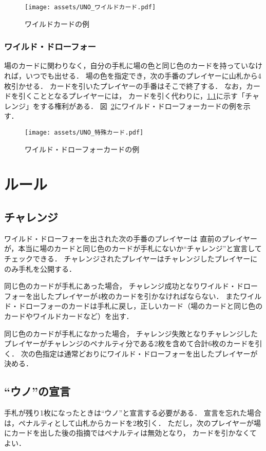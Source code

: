\documentclass[11pt]{ltjsarticle}
\newcommand{\figref}[1]{図~\ref{#1}}
\begin{document}
\begin{figure}[h]
  \begin{center}
    \texttt{[image: assets/UNO\_ワイルドカード.pdf]}
    \caption{ワイルドカードの例}
    \label{fig:ワイルドカードの例}
  \end{center}
\end{figure}

\subsubsection{ワイルド・ドローフォー}
場のカードに関わりなく，自分の手札に場の色と同じ色のカードを持っていなければ，いつでも出せる．
場の色を指定でき，次の手番のプレイヤーに山札から4枚引かせる．
カードを引いたプレイヤーの手番はそこで終了する．
なお，カードを引くこととなるプレイヤーには，
カードを引く代わりに，\ref{sec:チャレンジ}に示す「チャレンジ」をする権利がある\cite{日本ウノ協会公認ルール}．
\figref{fig:ワイルド・ドローフォーカードの例}にワイルド・ドローフォーカードの例を示す．

\begin{figure}[h]
  \begin{center}
    \texttt{[image: assets/UNO\_特殊カード.pdf]}
    \caption{ワイルド・ドローフォーカードの例}
    \label{fig:ワイルド・ドローフォーカードの例}
  \end{center}
\end{figure}

\newpage

\section{ルール}
\subsection{チャレンジ}
\label{sec:チャレンジ}
ワイルド・ドローフォーを出された次の手番のプレイヤーは
直前のプレイヤーが，本当に場のカードと同じ色のカードが手札にないか``チャレンジ''と宣言してチェックできる．
チャレンジされたプレイヤーはチャレンジしたプレイヤーにのみ手札を公開する．

同じ色のカードが手札にあった場合，
チャレンジ成功となりワイルド・ドローフォーを出したプレイヤーが4枚のカードを引かなければならない．
またワイルド・ドローフォーのカードは手札に戻し，正しいカード（場のカードと同じ色のカードやワイルドカードなど）を出す．

同じ色のカードが手札になかった場合，
チャレンジ失敗となりチャレンジしたプレイヤーがチャレンジのペナルティ分である2枚を含めて合計6枚のカードを引く．
次の色指定は通常どおりにワイルド・ドローフォーを出したプレイヤーが決める\cite{日本ウノ協会公認ルール}．

\subsection{``ウノ''の宣言}
\label{sec:``ウノ''の宣言}
手札が残り1枚になったときは``ウノ''と宣言する必要がある．
宣言を忘れた場合は，ペナルティとして山札からカードを2枚引く．
ただし，次のプレイヤーが場にカードを出した後の指摘ではペナルティは無効となり，
カードを引かなくてよい\cite{日本ウノ協会公認ルール}．

\newpage


\nocite{*}

\end{document}
